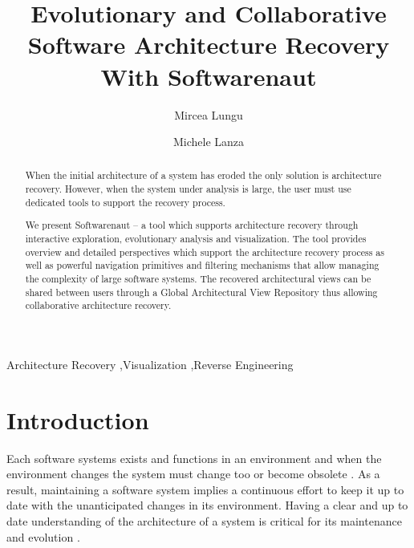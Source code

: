 \documentclass[preprint,12pt]{elsarticle}
\begin{document}
\begin{frontmatter}


\title{Evolutionary and Collaborative Software Architecture Recovery With Softwarenaut}

\author{Mircea Lungu}
\address{Software Composition Group - University of Bern, Switzerland}

\author{Michele Lanza}
\address{REVEAL @ Faculty of Informatics - University of Lugano, Switzerland}


\begin{abstract}

When the initial architecture of a system has eroded the only solution is architecture recovery. However, when the system under analysis is large, the user must use dedicated tools to support the recovery process. 

We present Softwarenaut -- a tool which supports architecture recovery through interactive exploration, evolutionary analysis and visualization. The tool provides overview and detailed perspectives which support the architecture recovery process as well as powerful navigation primitives and filtering mechanisms that allow managing the complexity of large software systems. The recovered architectural views can be shared between users through a Global Architectural View Repository thus allowing collaborative architecture recovery.

\end{abstract}

\begin{keyword}
Architecture Recovery \sep Visualization \sep Reverse Engineering
\end{keyword}

\end{frontmatter}

\section{Introduction} \label{sec:Introduction}

Each software systems exists and functions in an environment and when the environment changes the system must change too or become obsolete \cite{lehman-softev}. As a result, maintaining a software system implies a continuous effort to keep it up to date with the unanticipated changes in its environment. Having a clear and up to date understanding of the architecture of a system is critical for its maintenance and evolution \cite{Duca09c, pollet-sar}.
\end{document}
